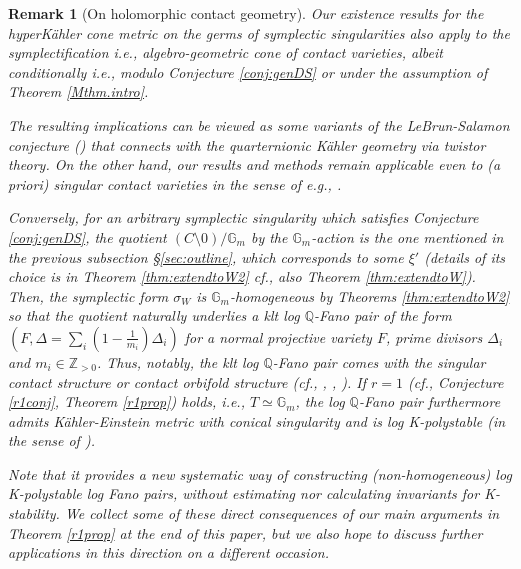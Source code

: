 \documentclass[12pt,a4paper]{amsart}
\newtheorem{Rem}[Thm]{Remark}
\theoremstyle{remark}
\theoremstyle{definition}
\def\G{\mathbb{G}}
\def\Z{\mathbb{Z}}
\def\Q{\mathbb{Q}}
\begin{document}
\begin{Rem}[On holomorphic contact geometry]\label{LSconj}
Our existence results for the hyperK\"ahler cone metric on the germs of 
symplectic singularities also apply to the symplectification i.e., 
algebro-geometric cone of contact 
varieties, albeit conditionally i.e., modulo Conjecture \ref{conj:genDS} or 
under the assumption of Theorem \ref{Mthm.intro}. 

The resulting implications
can be viewed as some 
variants of the LeBrun-Salamon conjecture (\cite{Le, 
LeS}) that connects with the quarternionic K\"ahler geometry via twistor theory. 
On the other hand, our results and 
methods remain applicable even to (a priori) {\it singular} contact 
varieties in the sense of e.g., \cite{Namf, Smi}. 

Conversely, 
for an arbitrary symplectic singularity 
which satisfies Conjecture \ref{conj:genDS}, 
the quotient $(C\setminus 0)/\G_m$ 
by the $\G_m$-action 
is the one mentioned in the previous 
subsection \S \ref{sec:outline},  which 
corresponds to some $\xi'$ 
(details of its choice is in Theorem  
\ref{thm:extendtoW2} cf., also 
Theorem \ref{thm:extendtoW}). 
Then, the symplectic form $\sigma_W$ 
is $\G_m$-homogeneous 
by Theorems \ref{thm:extendtoW2} 
so that 
the quotient naturally underlies a 
klt log $\Q$-Fano pair of the form 
$(F,\Delta=\sum_{i}(1-\frac{1}{m_i})\Delta_i)$ 
for a normal projective variety $F$, 
prime divisors $\Delta_i$ and $m_i\in \Z_{>0}$. 
Thus, notably, the klt log $\Q$-Fano pair 
comes with the 
{\it singular contact structure} or 
{\it contact orbifold structure} 
(cf., \cite[\S 2]{Le}, \cite[C.16]{Buc}, \cite[4.4.1]{Name}). 
If $r=1$ (cf., Conjecture \ref{r1conj}, Theorem \ref{r1prop}) holds, 
i.e., $T\simeq \G_m$, 
the log $\Q$-Fano pair furthermore admits 
K\"ahler-Einstein metric with conical singularity and is 
log K-polystable 
(in the sense of \cite{Don11, OS}). 

Note that
it provides a new 
systematic way of constructing (non-homogeneous) 
log K-polystable log Fano pairs, 
without estimating nor calculating invariants for K-stability. 
We collect some of these direct consequences of our main arguments in 
Theorem \ref{r1prop} at the end of this paper, but 
we also hope to discuss further applications in this direction on a different 
occasion. 
\end{Rem}
\end{document}
